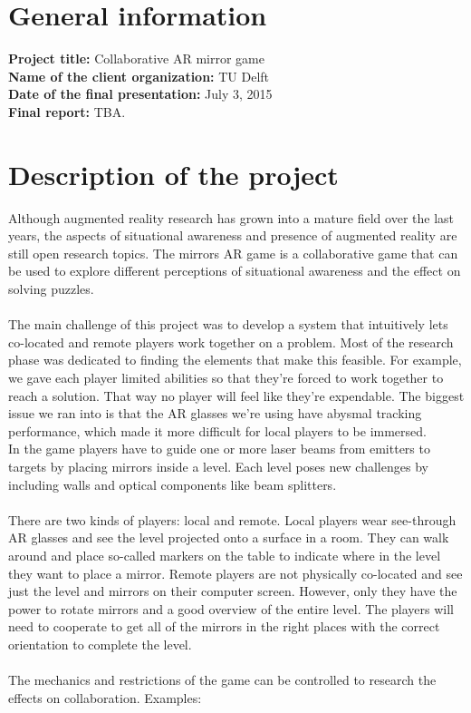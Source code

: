 \documentclass[]{article}
\begin{document}
\section*{General information}
\textbf{Project title:} Collaborative AR mirror game\\
\textbf{Name of the client organization:} TU Delft\\
\textbf{Date of the final presentation:} July 3, 2015\\
\textbf{Final report:} TBA.

\section*{Description of the project}
Although augmented reality research has grown into a mature field over the last
years, the aspects of situational awareness and presence of augmented reality
are still open research topics. The mirrors AR game is a collaborative game that
can be used to explore different perceptions of situational awareness and the
effect on solving puzzles. \\
\\
The main challenge of this project was to develop a system that intuitively lets
co-located and remote players work together on a problem. Most of the research
phase was dedicated to finding the elements that make this feasible. For
example, we gave each player limited abilities so that they're forced to work
together to reach a solution. That way no player will feel like they're
expendable. The biggest issue we ran into is that the AR glasses we're using
have abysmal tracking performance, which made it more difficult for local
players to be immersed.
\\
In the game players have to guide one or more laser beams from emitters to
targets by placing mirrors inside a level. Each level poses new challenges by
including walls and optical components like beam splitters. \\
\\
There are two kinds of players: local and remote. Local players wear see-through
AR glasses and see the level projected onto a surface in a room. They can walk
around and place so-called markers on the table to indicate where in the level
they want to place a mirror. Remote players are not physically co-located and
see just the level and mirrors on their computer screen. However, only they have
the power to rotate mirrors and a good overview of the entire level. The players
will need to cooperate to get all of the mirrors in the right places with the
correct orientation to complete the level. \\
\\
The mechanics and restrictions of the game can be controlled to research the
effects on collaboration. Examples:
\end{document}
